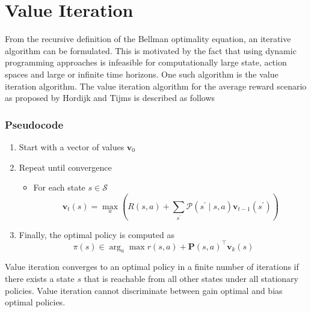 \section{Value Iteration}

From the recursive definition of the Bellman optimality equation, an iterative algorithm can be formulated. 
This is motivated by the fact that using dynamic programming approaches is infeasible for computationally large state, action spaces and large or infinite time horizons.
One such algorithm is the value iteration algorithm. The value iteration algorithm for the average reward scenario as proposed by Hordijk and Tijms \cite{hordijk_modified_1975} is described as follows

\subsubsection*{Pseudocode}
\begin{enumerate}
    \item Start with a vector of values $\mathbf{v}_0$
    \item Repeat until convergence 
    
    \begin{itemize}
        \item For each state $s \in \mathcal{S}$
        $$\mathbf{v}_t(s) = \max_a \left(R(s, a) + \sum_{s^\prime} \mathcal{P}(s^\prime \mid s, a) \mathbf{v}_{t-1}(s^\prime) \right)$$
    \end{itemize}
    
    
    \item Finally, the optimal policy is computed as
    $$\pi(s) \in \arg_a\max r(s,a) + \mathbf{P}(s,a)^\top \mathbf{v}_k(s) $$
    
\end{enumerate}

Value iteration converges to an optimal policy in a finite number of iterations if there exists a state $s$ that is reachable from all other states under all stationary policies.
Value iteration cannot discriminate between gain optimal and bias optimal policies.


